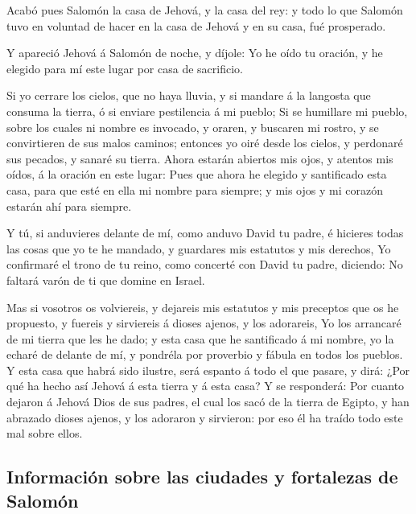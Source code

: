  Acabó pues Salomón la casa de Jehová, y la casa del rey:
y todo lo que Salomón tuvo en voluntad de hacer en la casa de Jehová y
en su casa, fué prosperado.

 Y apareció Jehová á Salomón de noche, y díjole: Yo he
oído tu oración, y he elegido para mí este lugar por casa de sacrificio.

 Si yo cerrare los cielos, que no haya lluvia, y si
mandare á la langosta que consuma la tierra, ó si enviare pestilencia á
mi pueblo;  Si se humillare mi pueblo, sobre los cuales
ni nombre es invocado, y oraren, y buscaren mi rostro, y se convirtieren
de sus malos caminos; entonces yo oiré desde los cielos, y perdonaré sus
pecados, y sanaré su tierra.  Ahora estarán abiertos mis
ojos, y atentos mis oídos, á la oración en este lugar: 
Pues que ahora he elegido y santificado esta casa, para que esté en ella
mi nombre para siempre; y mis ojos y mi corazón estarán ahí para
siempre.

 Y tú, si anduvieres delante de mí, como anduvo David tu
padre, é hicieres todas las cosas que yo te he mandado, y guardares mis
estatutos y mis derechos,  Yo confirmaré el trono de tu
reino, como concerté con David tu padre, diciendo: No faltará varón de
ti que domine en Israel.

 Mas si vosotros os volviereis, y dejareis mis estatutos
y mis preceptos que os he propuesto, y fuereis y sirviereis á dioses
ajenos, y los adorareis,  Yo los arrancaré de mi tierra
que les he dado; y esta casa que he santificado á mi nombre, yo la
echaré de delante de mí, y pondréla por proverbio y fábula en todos los
pueblos.  Y esta casa que habrá sido ilustre, será
espanto á todo el que pasare, y dirá: ¿Por qué ha hecho así Jehová á
esta tierra y á esta casa?  Y se responderá: Por cuanto
dejaron á Jehová Dios de sus padres, el cual los sacó de la tierra de
Egipto, y han abrazado dioses ajenos, y los adoraron y sirvieron: por
eso él ha traído todo este mal sobre ellos.

\hypertarget{informaciuxf3n-sobre-las-ciudades-y-fortalezas-de-salomuxf3n}{%
\subsection{Información sobre las ciudades y fortalezas de
Salomón}\label{informaciuxf3n-sobre-las-ciudades-y-fortalezas-de-salomuxf3n}}

